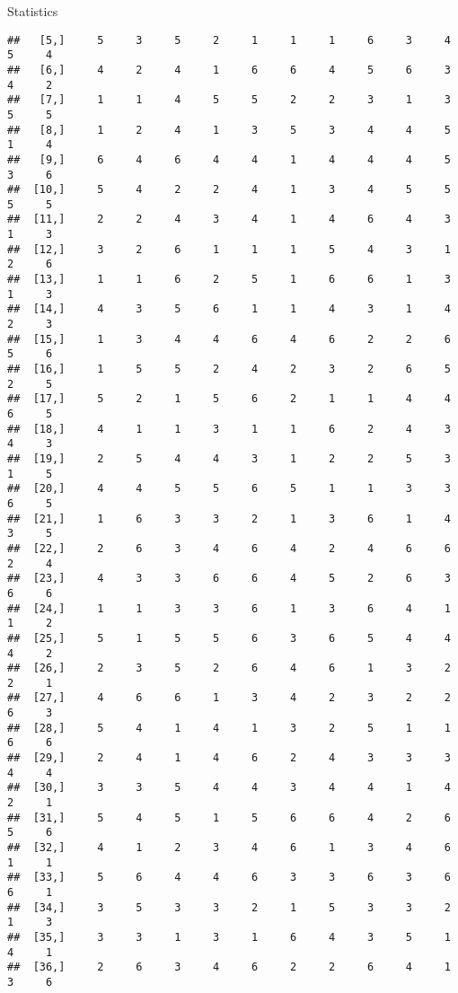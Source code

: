 \documentclass[
  ignorenonframetext,
]{beamer}
\begin{document}
\begin{frame}[fragile]{Statistics}
\begin{verbatim}
##   [5,]     5     3     5     2     1     1     1     6     3     4     5     4
##   [6,]     4     2     4     1     6     6     4     5     6     3     4     2
##   [7,]     1     1     4     5     5     2     2     3     1     3     5     5
##   [8,]     1     2     4     1     3     5     3     4     4     5     1     4
##   [9,]     6     4     6     4     4     1     4     4     4     5     3     6
##  [10,]     5     4     2     2     4     1     3     4     5     5     5     5
##  [11,]     2     2     4     3     4     1     4     6     4     3     1     3
##  [12,]     3     2     6     1     1     1     5     4     3     1     2     6
##  [13,]     1     1     6     2     5     1     6     6     1     3     1     3
##  [14,]     4     3     5     6     1     1     4     3     1     4     2     3
##  [15,]     1     3     4     4     6     4     6     2     2     6     5     6
##  [16,]     1     5     5     2     4     2     3     2     6     5     2     5
##  [17,]     5     2     1     5     6     2     1     1     4     4     6     5
##  [18,]     4     1     1     3     1     1     6     2     4     3     4     3
##  [19,]     2     5     4     4     3     1     2     2     5     3     1     5
##  [20,]     4     4     5     5     6     5     1     1     3     3     6     5
##  [21,]     1     6     3     3     2     1     3     6     1     4     3     5
##  [22,]     2     6     3     4     6     4     2     4     6     6     2     4
##  [23,]     4     3     3     6     6     4     5     2     6     3     6     6
##  [24,]     1     1     3     3     6     1     3     6     4     1     1     2
##  [25,]     5     1     5     5     6     3     6     5     4     4     4     2
##  [26,]     2     3     5     2     6     4     6     1     3     2     2     1
##  [27,]     4     6     6     1     3     4     2     3     2     2     6     3
##  [28,]     5     4     1     4     1     3     2     5     1     1     6     6
##  [29,]     2     4     1     4     6     2     4     3     3     3     4     4
##  [30,]     3     3     5     4     4     3     4     4     1     4     2     1
##  [31,]     5     4     5     1     5     6     6     4     2     6     5     6
##  [32,]     4     1     2     3     4     6     1     3     4     6     1     1
##  [33,]     5     6     4     4     6     3     3     6     3     6     6     1
##  [34,]     3     5     3     3     2     1     5     3     3     2     1     3
##  [35,]     3     3     1     3     1     6     4     3     5     1     4     1
##  [36,]     2     6     3     4     6     2     2     6     4     1     3     6

\end{verbatim}
\end{frame}
\end{document}
